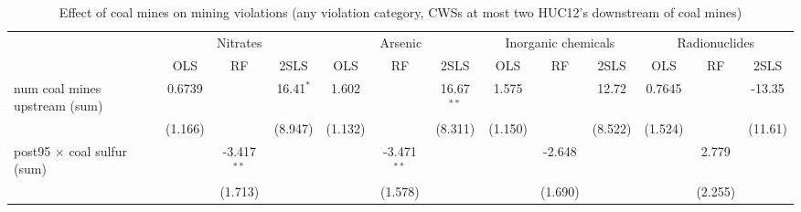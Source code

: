 
\begin{table}[htbp]
   
   \caption{\label{2sls_dwnstrm2step_minevio_allcat_ivsum} Effect of coal mines on mining violations (any violation category, CWSs at most two HUC12's downstream of coal mines)}
   \bigskip
   
   \centering
   
   \begin{adjustbox}{width = \textwidth, center}
      
      
      \begin{tabular}{lcccccccccccc}
         \toprule
         
          & \multicolumn{3}{c}{Nitrates} & \multicolumn{3}{c}{Arsenic} & \multicolumn{3}{c}{Inorganic chemicals} & \multicolumn{3}{c}{Radionuclides}\\
         
                                                                            & OLS           & RF            & 2SLS          & OLS           & RF            & 2SLS          & OLS           & RF            & 2SLS          & OLS           & RF            & 2SLS\\  
         
         \midrule 
         num coal mines upstream (sum)                                      & 0.6739        &               & 16.41$^{*}$   & 1.602         &               & 16.67$^{**}$  & 1.575         &               & 12.72         & 0.7645        &               & -13.35\\   
                                                                            & (1.166)       &               & (8.947)       & (1.132)       &               & (8.311)       & (1.150)       &               & (8.522)       & (1.524)       &               & (11.61)\\   
         post95 $\times$ coal sulfur (sum)                                  &               & -3.417$^{**}$ &               &               & -3.471$^{**}$ &               &               & -2.648        &               &               & 2.779         &   \\   
                                                                            &               & (1.713)       &               &               & (1.578)       &               &               & (1.690)       &               &               & (2.255)       &   \\   
         

\end{tabular}
\end{adjustbox}
\end{table}
